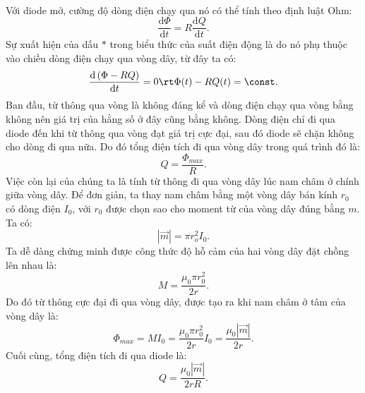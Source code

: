 \begin{loigiai}
    \\Với diode mở, cường độ dòng điện chạy qua nó có thể tính theo định luật Ohm:
    \[\dfrac{\mathrm{d}\Phi}{\mathrm{d}t}=R\dfrac{\mathrm{d}Q}{\mathrm{d}t}.\]
    Sự xuất hiện của dấu $*$ trong biểu thức của suất điện động là do nó phụ thuộc vào chiều dòng điện chạy qua vòng dây, từ đây ta có:
    \[\dfrac{\mathrm{d}\left(\Phi -RQ\right)}{\mathrm{d}t}=0
    \rt \Phi(t)-RQ(t)=\const.\]
    Ban đầu, từ thông qua vòng là không đáng kể và dòng điện chạy qua vòng bằng không nên giá trị của hằng số ở đây cũng bằng không. Dòng điện chỉ đi qua diode đến khi từ thông qua vòng đạt giá trị cực đại, sau đó diode sẽ chặn không cho dòng đi qua nữa. Do đó tổng điện tích đi qua vòng dây trong quá trình đó là:
    \[Q=\dfrac{\Phi_{max}}{R}.\]
    Việc còn lại của chúng ta là tính từ thông đi qua vòng dây lúc nam châm ở chính giữa vòng dây. Để đơn giản, ta thay nam châm bằng một vòng dây bán kính $r_0$ có dòng điện $I_0$, với $r_0$ được chọn sao cho moment từ của vòng dây đúng bằng $m$. Ta có:
    \[\left|\Vec{m}\right|=\pi r_o^2I_0.\]
    Ta dễ dàng chứng minh được công thức độ hỗ cảm của hai vòng dây đặt chồng lên nhau là: 
    \[M=\dfrac{\mu_0 \pi r_0^2}{2r}.\]
    Do đó từ thông cực đại đi qua vòng dây, được tạo ra khi nam châm ở tâm của vòng dây là:
    \[\Phi_{max}=MI_0=\dfrac{\mu_0 \pi r_0^2}{2r}I_0=\dfrac{\mu_0 \left|\Vec{m}\right|}{2r}.\]
    Cuối cùng, tổng điện tích đi qua diode là:
    \[Q=\dfrac{\mu_0 \left|\Vec{m}\right|}{2rR}.\]
\end{loigiai}


